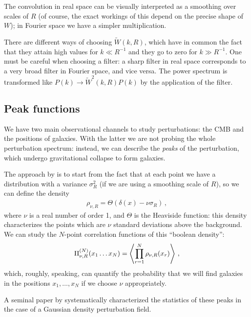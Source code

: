 \documentclass[main.tex]{subfiles}
\begin{document}
The convolution in real space can be visually interpreted as a smoothing over scales of \(R\) (of course, the exact workings of this depend on the precise shape of \(W\)); in Fourier space we have a simpler multiplication.

There are different ways of choosing \(\widetilde{W}(k, R)\), which have in common the fact that they attain high values for \(k \ll R^{-1}\) and they go to zero for \(k \gg R^{-1}\). 
One must be careful when choosing a filter: a sharp filter in real space corresponds to a very broad filter in Fourier space, and vice versa. 
The power spectrum is transformed like \(P(k) \to \widetilde{W}^2(k, R) P(k)\) by the application of the filter.

\subsection{Peak functions}

We have two main observational channels to study perturbations: the CMB and the positions of galaxies.
With the latter we are not probing the whole perturbation spectrum: instead, we can describe the \emph{peaks} of the perturbation, which undergo gravitational collapse to form galaxies. 

The approach by \textcite[]{matarresePathintegralApproachLargescale1986} is to start from the fact that at each point we have a distribution with a variance \(\sigma_R^2\) (if we are using a smoothing scale of \(R\)), so we can define the density 
%
\begin{align}
\rho_{\nu , R} = \Theta (\delta (x) - \nu \sigma _R)
\,,
\end{align}
%
where \(\nu \) is a real number of order 1, and \(\Theta \) is the Heaviside function: this density characterizes the points which are \(\nu \) standard deviations above the background. 
We can study the \(N\)-point correlation functions of this ``boolean density'': 
%
\begin{align}
\Pi^{(N)}_{\nu , R} (x_1 \dots x_N) = \expval{ \prod_{r=1}^{N} \rho _{\nu , R} (x_r)}
\,,
\end{align}
%
which, roughly, speaking, can quantify the probability that we will find galaxies in the positions \(x_1, \dots, x_N\) if we choose \(\nu \) appropriately. 

A seminal paper by \textcite[]{bardeenStatisticsPeaksGaussian1986} systematically characterized the statistics of these peaks in the case of a Gaussian density perturbation field.
\end{document}
